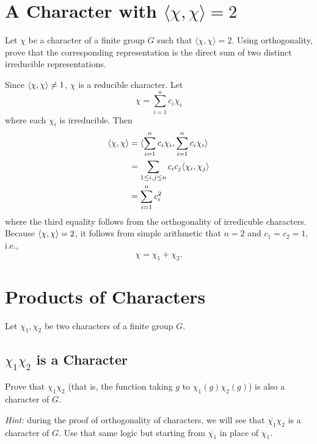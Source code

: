\documentclass[12pt]{article}
\begin{document}

\section{A Character with $\langle \chi, \chi \rangle = 2$}

Let $\chi$ be a character of a finite group $G$ such that
$\langle \chi, \chi \rangle = 2$.  Using orthogonality, prove that the
corresponding representation is the direct sum of two distinct irreducible
representations.

\noindent\dotfill

Since $\langle\chi, \chi\rangle \neq 1$, $\chi$ is a reducible character. 
Let 
$$\chi = \sum_{i = 1}^{n} c_i \chi_i $$
where each $\chi_{i}$ is irreducible. 
Then 
\begin{align*}
  \langle\chi, \chi\rangle & = \langle\sum_{i = 1}^{n} c_{i} \chi_{i}, \sum_{i = 1}^{n} c_{i} \chi_{i}\rangle \\ 
                 & = \sum_{1 \leq i, j \leq n} c_i c_j \langle\chi_{i}, \chi_{j}\rangle \\ 
                 & = \sum_{i = 1}^{n} c_{i}^{2} 
\end{align*}
where the third equality follows from the orthogonality of irredicuble characters. 
Because $\langle\chi, \chi\rangle = 2$, it follows from simple arithmetic that $n = 2$ and $c_{1} = c_{2} = 1$, i.e., 
$$\chi = \chi_{1} + \chi_{2}.$$


\section{Products of Characters}

Let $\chi_1, \chi_2$ be two characters of a finite group $G$.

\subsection{$\chi_1 \chi_2$ is a Character}

Prove that $\chi_1 \chi_2$ (that is, the function taking $g$ to
$\chi_1(g)\chi_2(g)$) is also a character of $G$.

\emph{Hint:} during the proof of orthogonality of characters, we will see that
$\overline{\chi_1}\chi_2$ is a character of $G$.  Use that same logic but
starting from $\overline{\chi_1}$ in place of $\chi_1$.
\end{document}
